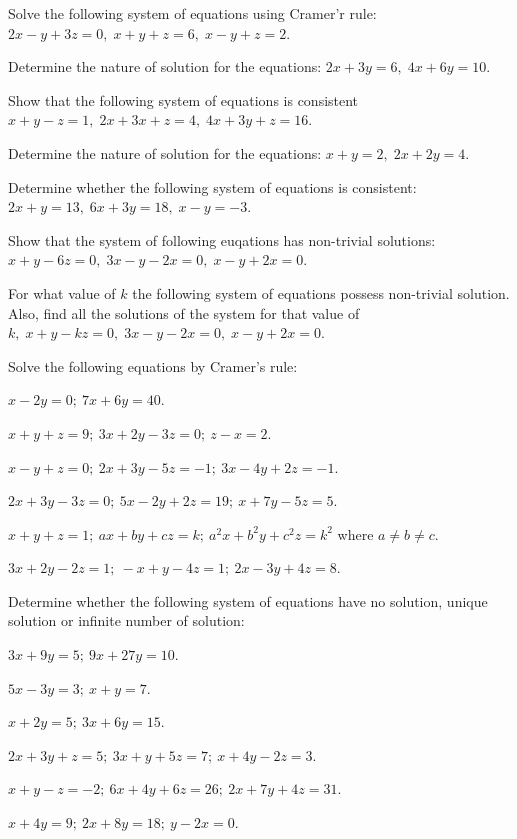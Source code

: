 \item Solve the following system of equations using Cramer'r rule: $2x - y + 3z = 0,\;x + y + z = 6,\;x - y + z = 2$.
\item Determine the nature of solution for the equations: $2x + 3y = 6,\;4x + 6y = 10$.
\item Show that the following system of equations is consistent $x + y - z = 1,\;2x + 3x + z = 4,\;4x + 3y + z = 16$.
\item Determine the nature of solution for the equations: $x + y = 2,\;2x + 2y = 4$.
\item Determine whether the following system of equations is consistent: $2x + y = 13,\;6x + 3y = 18,\;x - y = -3$.
\item Show that the system of following euqations has non-trivial solutions: $x + y - 6z = 0,\;3x - y - 2x = 0,\;x - y + 2x = 0$.
\item For what value of $k$ the following system of equations possess non-trivial solution. Also, find all the solutions of the
  system for that value of $k,\;x + y - kz = 0,\;3x - y - 2x = 0,\;x - y + 2x = 0$.
\stopitemize

Solve the following equations by Cramer's rule:

\item $x - 2y = 0;\ 7x + 6y = 40$.
\item $x + y + z = 9;\ 3x + 2y - 3z = 0;\ z - x = 2$.
\item $x - y + z = 0;\ 2x + 3y - 5z = -1;\ 3x - 4y + 2z = -1$.
\item $2x + 3y - 3z = 0;\ 5x - 2y + 2z = 19;\ x + 7y - 5z = 5$.
\item $x + y + z = 1;\ ax + by + cz = k;\ a^2x + b^2y + c^2z = k^2$ where $a\neq b\neq c$.
\item $3x + 2y - 2z = 1;\ -x + y - 4z = 1;\ 2x - 3y + 4z = 8$.
\stopitemize

Determine whether the following system of equations have no solution, unique solution or infinite number of solution:

\item $3x + 9y = 5;\ 9x + 27y = 10$.
\item $5x - 3y = 3;\ x + y = 7$.
\item $x + 2y = 5;\ 3x + 6y = 15$.
\item $2x + 3y + z = 5;\ 3x + y + 5z = 7;\ x + 4y - 2z = 3$.
\item $x + y - z = -2;\ 6x + 4y + 6z = 26;\ 2x + 7y + 4z = 31$.
\item $x + 4y = 9;\ 2x + 8y = 18;\ y - 2x = 0$.
\stopitemize

